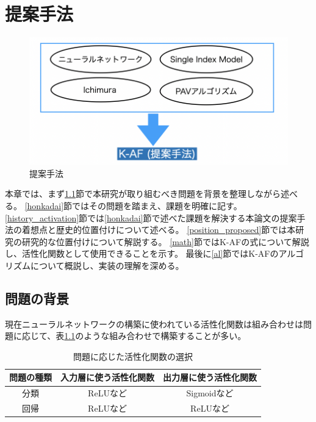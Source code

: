 \chapter{提案手法}
\label{proposed}



\begin{figure}[hbtp]
\includegraphics[width=15cm]{asset/proposed_method.png}
	\caption{提案手法}
	\label{proposed_method}
\end{figure}

本章では、まず\ref{mondai}節で本研究が取り組むべき問題を背景を整理しながら述べる。
\ref{honkadai}節ではその問題を踏まえ、課題を明確に記す。
\ref{history_activation}節では\ref{honkadai}節で述べた課題を解決する本論文の提案手法の着想点と歴史的位置付けについて述べる。
\ref{position_proposed}節では本研究の研究的な位置付けについて解説する。
\ref{math}節ではK-AFの式について解説し、活性化関数として使用できることを示す。
最後に\ref{al}節ではK-AFのアルゴリズムについて概説し、実装の理解を深める。




\section{問題の背景}
\label {mondai}


現在ニューラルネットワークの構築に使われている活性化関数は組み合わせは問題に応じて、表\ref{which_to_use}のような組み合わせで構築することが多い。

\begin{table}[htbp]
\label{exp:iris}
    \begin{center}
        \caption{問題に応じた活性化関数の選択}
        \label{which_to_use}
        \vspace{2mm} 
        \hline
        \begin{tabular}{ |c|c|c| }
        問題の種類 & 入力層に使う活性化関数 & 出力層に使う活性化関数\\
        \hline
        分類  & ReLUなど & Sigmoidなど \\
        \hline
        回帰  & ReLUなど & ReLUなど \\
        \hline
        \end{tabular}
    \end{center}
\end{table}

